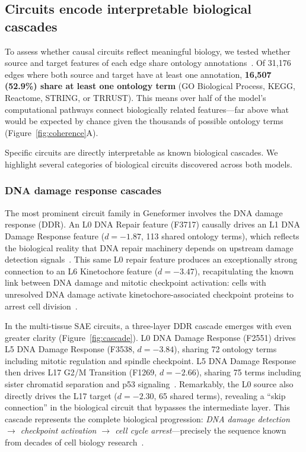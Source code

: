 \documentclass[onecolumn]{article}
\begin{document}
\subsection{Circuits encode interpretable biological cascades}
\label{sec:biology}

To assess whether causal circuits reflect meaningful biology, we tested whether source and target features of each edge share ontology annotations~\citep{ashburner2000go,kanehisa2000kegg,jassal2020reactome,szklarczyk2023string,han2018trrust}. Of 31,176 edges where both source and target have at least one annotation, \textbf{16,507 (52.9\%) share at least one ontology term} (GO Biological Process, KEGG, Reactome, STRING, or TRRUST). This means over half of the model's computational pathways connect biologically related features---far above what would be expected by chance given the thousands of possible ontology terms (Figure~\ref{fig:coherence}A).

Specific circuits are directly interpretable as known biological cascades. We highlight several categories of biological circuits discovered across both models.

\subsubsection{DNA damage response cascades}

The most prominent circuit family in Geneformer involves the DNA damage response (DDR). An L0 DNA Repair feature (F3717) causally drives an L1 DNA Damage Response feature ($d = -1.87$, 113 shared ontology terms), which reflects the biological reality that DNA repair machinery depends on upstream damage detection signals~\citep{ciccia2010ddr,jackson2009ddr}. This same L0 repair feature produces an exceptionally strong connection to an L6 Kinetochore feature ($d = -3.47$), recapitulating the known link between DNA damage and mitotic checkpoint activation: cells with unresolved DNA damage activate kinetochore-associated checkpoint proteins to arrest cell division~\citep{musacchio2007spindle,malumbres2009cell}.

In the multi-tissue SAE circuits, a three-layer DDR cascade emerges with even greater clarity (Figure~\ref{fig:cascade}). L0 DNA Damage Response (F2551) drives L5 DNA Damage Response (F3538, $d = -3.84$), sharing 72 ontology terms including mitotic regulation and spindle checkpoint. L5 DNA Damage Response then drives L17 G2/M Transition (F1269, $d = -2.66$), sharing 75 terms including sister chromatid separation and p53 signaling~\citep{ciccia2010ddr}. Remarkably, the L0 source also directly drives the L17 target ($d = -2.30$, 65 shared terms), revealing a ``skip connection'' in the biological circuit that bypasses the intermediate layer. This cascade represents the complete biological progression: \emph{DNA damage detection $\to$ checkpoint activation $\to$ cell cycle arrest}---precisely the sequence known from decades of cell biology research~\citep{jackson2009ddr,malumbres2009cell}.
\end{document}
